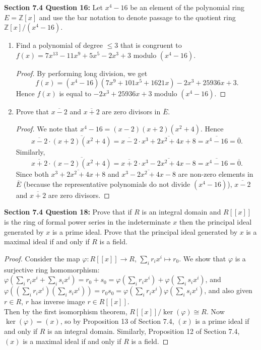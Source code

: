\documentclass{article}
\begin{document}
\textbf{Section 7.4 Question 16:} Let $x^4-16$ be an element of the
  polynomial ring $E=\mathbb{Z}[x]$ and use the bar notation to denote
  passage to the quotient ring $\mathbb{Z}[x]/(x^4-16)$.
  \begin{enumerate}[label={\bf(\alph*)}]
    \item Find a polynomial of degree $\leq3$ that is congruent to
      $f(x)=7x^{13}-11x^9+5x^5-2x^3+3$ modulo $(x^4-16)$.
      \begin{proof}
        By performing long division, we get
        \[f(x)=(x^4-16)(7x^9+101x^5+1621x)-2x^3+25936x+3.\]
        Hence $f(x)$ is equal to $-2x^3+25936x+3$ modulo $(x^4-16)$.
      \end{proof}

    \item Prove that $\overline{x-2}$ and $\overline{x+2}$ are zero
      divisors in $\overline{E}$.
      \begin{proof}
        We note that $x^4-16=(x-2)(x+2)(x^2+4)$. Hence
        \[\overline{x-2}\cdot\overline{(x+2)(x^2+4)}=
        \overline{x-2}\cdot\overline{x^3+2x^2+4x+8}=
        \overline{x^4-16}=\overline{0}.\]
        Similarly,
        \[\overline{x+2}\cdot\overline{(x-2)(x^2+4)}=
        \overline{x+2}\cdot\overline{x^3-2x^2+4x-8}=
        \overline{x^4-16}=\overline{0}.\]
        Since both $\overline{x^3+2x^2+4x+8}$ and
        $\overline{x^3-2x^2+4x-8}$ are non-zero elements in $\overline{E}$
        (because the representative polynomials do not divide $(x^4-16)$),
        $\overline{x-2}$ and $\overline{x+2}$ are zero divisors.
      \end{proof}
  \end{enumerate}

\textbf{Section 7.4 Question 18:} Prove that if $R$ is an integral domain
  and $R[[x]]$ is the ring of formal power series in the indeterminate $x$
  then the principal ideal generated by $x$ is a prime ideal. Prove that
  the principal ideal generated by $x$ is a maximal ideal if and only if
  $R$ is a field.

  \begin{proof}
    Consider the map $\varphi:R[[x]]\rightarrow R$, $\sum_ir_ix^i\mapsto
    r_0$. We show that $\varphi$ is a surjective ring homomorphism:
    $\varphi(\sum_ir_ix^i+\sum_is_ix^i) =r_0+s_0 =
    \varphi(\sum_ir_ix^i)+\varphi(\sum_is_ix^i)$, and
    $\varphi((\sum_ir_ix^i)(\sum_is_ix^i)) =r_0s_0 =
    \varphi(\sum_ir_ix^i)\varphi(\sum_is_ix^i)$, and also
    given $r\in R$, $r$ has inverse image $r\in R[[x]]$. \\

    Then by the first isomorphism theorem, $R[[x]]/\ker(\varphi)\cong R$.
    Now $\ker(\varphi)=(x)$, so by Proposition 13 of Section 7.4, $(x)$ is
    a prime ideal if and only if $R$ is an integral domain. Similarly,
    Proposition 12 of Section 7.4, $(x)$ is a maximal ideal if and only if
    $R$ is a field.
  \end{proof}
\end{document}
